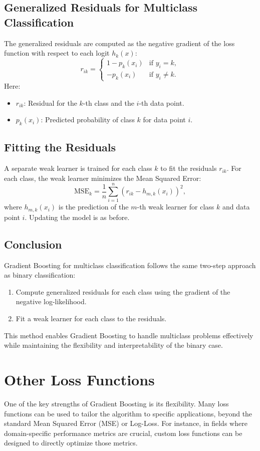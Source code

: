 \documentclass[12pt]{article}
\begin{document}
\subsection*{Generalized Residuals for Multiclass Classification}
The generalized residuals are computed as the negative gradient of the loss function with respect to each logit \( h_k(x) \):
\[
r_{ik} = \begin{cases} 
1 - p_k(x_i) & \text{if } y_i = k, \\
-p_k(x_i) & \text{if } y_i \neq k.
\end{cases}
\]
Here:
\begin{itemize}
    \item \( r_{ik} \): Residual for the \( k \)-th class and the \( i \)-th data point.
    \item \( p_k(x_i) \): Predicted probability of class \( k \) for data point \( i \).
\end{itemize}

\subsection*{Fitting the Residuals}
A separate weak learner is trained for each class \( k \) to fit the residuals \( r_{ik} \). For each class, the weak learner minimizes the Mean Squared Error:
\[
\text{MSE}_k = \frac{1}{n} \sum_{i=1}^n (r_{ik} - h_{m,k}(x_i))^2,
\]
where \( h_{m,k}(x_i) \) is the prediction of the \( m \)-th weak learner for class \( k \) and data point \( i \).
Updating the model is as before.

\subsection*{Conclusion}
Gradient Boosting for multiclass classification follows the same two-step approach as binary classification:
\begin{enumerate}
    \item Compute generalized residuals for each class using the gradient of the negative log-likelihood.
    \item Fit a weak learner for each class to the residuals.
\end{enumerate}
This method enables Gradient Boosting to handle multiclass problems effectively while maintaining the flexibility and interpretability of the binary case.

\section*{Other Loss Functions}
One of the key strengths of Gradient Boosting is its flexibility. 
Many loss functions can be used to tailor the algorithm to specific applications, 
beyond the standard Mean Squared Error (MSE) or Log-Loss. 
For instance, in fields where domain-specific performance metrics are crucial, 
custom loss functions can be designed to directly optimize those metrics.
\end{document}
